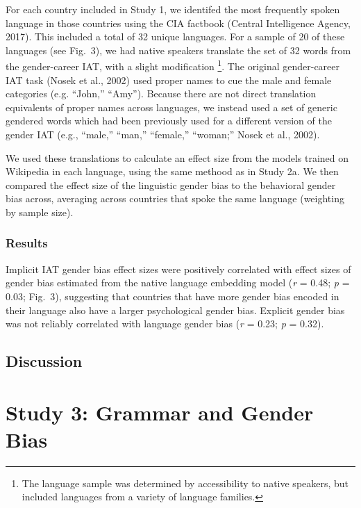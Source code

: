 \documentclass[10pt, letterpaper]{article}
\begin{document}
For each country included in Study 1, we identifed the most frequently
spoken language in those countries using the CIA factbook (Central
Intelligence Agency, 2017). This included a total of 32 unique
languages. For a sample of 20 of these languages (see Fig.~3), we had
native speakers translate the set of 32 words from the gender-career
IAT, with a slight modification
\footnote{The language sample was determined by accessibility to native speakers, but included languages from a variety of language families.}.
The original gender-career IAT task (Nosek et al., 2002) used proper
names to cue the male and female categories (e.g. ``John,'' ``Amy'').
Because there are not direct translation equivalents of proper names
across languages, we instead used a set of generic gendered words which
had been previously used for a different version of the gender IAT
(e.g., ``male,'' ``man,'' ``female,'' ``woman;'' Nosek et al., 2002).

We used these translations to calculate an effect size from the models
trained on Wikipedia in each language, using the same methood as in
Study 2a. We then compared the effect size of the linguistic gender bias
to the behavioral gender bias across, averaging across countries that
spoke the same language (weighting by sample size).

\subsubsection{Results}\label{results-2}

Implicit IAT gender bias effect sizes were positively correlated with
effect sizes of gender bias estimated from the native language embedding
model (\emph{r} = 0.48; \emph{p} = 0.03; Fig.~3), suggesting that
countries that have more gender bias encoded in their language also have
a larger psychological gender bias. Explicit gender bias was not
reliably correlated with language gender bias (\emph{r} = 0.23; \emph{p}
= 0.32).

\subsection{Discussion}\label{discussion-1}

\section{Study 3: Grammar and Gender
Bias}\label{study-3-grammar-and-gender-bias}
\end{document}

